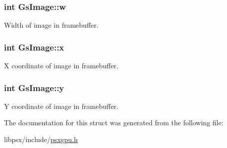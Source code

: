 \subsubsection[{w}]{\setlength{\rightskip}{0pt plus 5cm}int Gs\+Image\+::w}\label{structGsImage_a9161db2be29ff2caf39a9b8fea7256fc}


Width of image in framebuffer. 

\hypertarget{structGsImage_a7f481bb2d04e6d2fcab28a70740a087b}{}
\subsubsection[{x}]{\setlength{\rightskip}{0pt plus 5cm}int Gs\+Image\+::x}\label{structGsImage_a7f481bb2d04e6d2fcab28a70740a087b}


X coordinate of image in framebuffer. 

\hypertarget{structGsImage_abe372808a69fc03db2f832375a28f421}{}
\subsubsection[{y}]{\setlength{\rightskip}{0pt plus 5cm}int Gs\+Image\+::y}\label{structGsImage_abe372808a69fc03db2f832375a28f421}


Y coordinate of image in framebuffer. 



The documentation for this struct was generated from the following file\+:\begin{DoxyCompactItemize}
\item 
libpsx/include/\hyperlink{psxgpu_8h}{psxgpu.\+h}\end{DoxyCompactItemize}
